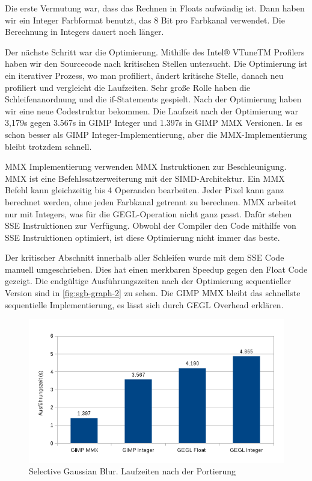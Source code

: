 Die erste Vermutung war, dass das Rechnen in Floats aufwändig ist. Dann haben wir ein Integer Farbformat benutzt, das 8 Bit pro Farbkanal verwendet. Die Berechnung in Integers dauert noch länger.

Der nächste Schritt war die Optimierung. Mithilfe des Intel® VTuneTM Profilers haben wir den Sourcecode nach kritischen Stellen untersucht. Die Optimierung ist ein iterativer Prozess, wo man profiliert, ändert kritische Stelle, danach neu profiliert und vergleicht die Laufzeiten. Sehr große Rolle haben die Schleifenanordnung  und die if-Statements gespielt. Nach der Optimierung haben wir eine neue Codestruktur bekommen. Die Laufzeit nach der Optimierung war 3,179s gegen 3.567s in GIMP Integer und 1.397s in GIMP MMX Versionen. Is es schon besser als GIMP Integer-Implementierung, aber die MMX-Implementierung bleibt trotzdem schnell.

MMX Implementierung verwenden MMX Instruktionen zur Beschleunigung. MMX ist eine Befehlssatzerweiterung mit der SIMD-Architektur. Ein MMX Befehl kann gleichzeitig bis 4 Operanden bearbeiten. Jeder Pixel kann ganz berechnet werden, ohne jeden Farbkanal getrennt zu berechnen. MMX arbeitet nur mit Integers, was für die GEGL-Operation nicht ganz passt. Dafür stehen SSE Instruktionen zur Verfügung. Obwohl der Compiler den Code mithilfe von SSE Instruktionen optimiert, ist diese Optimierung nicht immer das beste.

Der kritischer Abschnitt innerhalb aller Schleifen wurde mit dem SSE Code manuell umgeschrieben. Dies hat einen merkbaren Speedup gegen den Float Code
gezeigt. Die endgültige Ausführungszeiten nach der Optimierung sequentieller Version sind in \autoref{fig:sgb-graph-2} zu sehen. Die GIMP MMX bleibt das schnellste sequentielle Implementierung, es lässt sich durch GEGL Overhead erklären.
\begin{figure}
\centering
\includegraphics[scale=0.75]{graphs/sgb-graph-1.png}
\caption{Selective Gaussian Blur. Laufzeiten nach der Portierung}
\label{fig:sgb-graph-1}
\end{figure} 

